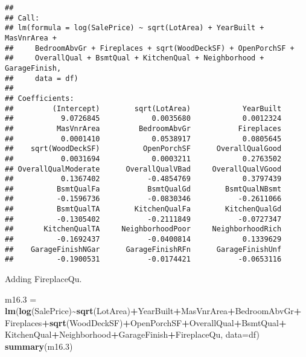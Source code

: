 \documentclass[
]{article}
\newenvironment{Shaded}{\begin{snugshade}}{\end{snugshade}}
\newcommand{\AttributeTok}[1]{\textcolor[rgb]{0.13,0.29,0.53}{#1}}
\newcommand{\FloatTok}[1]{\textcolor[rgb]{0.00,0.00,0.81}{#1}}
\newcommand{\FunctionTok}[1]{\textcolor[rgb]{0.13,0.29,0.53}{\textbf{#1}}}
\newcommand{\NormalTok}[1]{#1}
\newcommand{\OtherTok}[1]{\textcolor[rgb]{0.56,0.35,0.01}{#1}}
\newcommand{\SpecialCharTok}[1]{\textcolor[rgb]{0.81,0.36,0.00}{\textbf{#1}}}
\begin{document}
\begin{verbatim}
## 
## Call:
## lm(formula = log(SalePrice) ~ sqrt(LotArea) + YearBuilt + MasVnrArea + 
##     BedroomAbvGr + Fireplaces + sqrt(WoodDeckSF) + OpenPorchSF + 
##     OverallQual + BsmtQual + KitchenQual + Neighborhood + GarageFinish, 
##     data = df)
## 
## Coefficients:
##         (Intercept)        sqrt(LotArea)            YearBuilt  
##           9.0726845            0.0035680            0.0012324  
##          MasVnrArea         BedroomAbvGr           Fireplaces  
##           0.0001410            0.0538917            0.0805645  
##    sqrt(WoodDeckSF)          OpenPorchSF      OverallQualGood  
##           0.0031694            0.0003211            0.2763502  
## OverallQualModerate      OverallQualVBad     OverallQualVGood  
##           0.1367402           -0.4854769            0.3797439  
##          BsmtQualFa           BsmtQualGd        BsmtQualNBsmt  
##          -0.1596736           -0.0830346           -0.2611066  
##          BsmtQualTA        KitchenQualFa        KitchenQualGd  
##          -0.1305402           -0.2111849           -0.0727347  
##       KitchenQualTA     NeighborhoodPoor     NeighborhoodRich  
##          -0.1692437           -0.0400814            0.1339629  
##    GarageFinishNGar      GarageFinishRFn      GarageFinishUnf  
##          -0.1900531           -0.0174421           -0.0653116
\end{verbatim}

Adding FireplaceQu.

\begin{Shaded}
\begin{Highlighting}[]
\NormalTok{m16}\FloatTok{.3} \OtherTok{=} \FunctionTok{lm}\NormalTok{(}\FunctionTok{log}\NormalTok{(SalePrice)}\SpecialCharTok{\textasciitilde{}}\FunctionTok{sqrt}\NormalTok{(LotArea)}\SpecialCharTok{+}\NormalTok{YearBuilt}\SpecialCharTok{+}\NormalTok{MasVnrArea}\SpecialCharTok{+}\NormalTok{BedroomAbvGr}\SpecialCharTok{+}
\NormalTok{             Fireplaces}\SpecialCharTok{+}\FunctionTok{sqrt}\NormalTok{(WoodDeckSF)}\SpecialCharTok{+}\NormalTok{OpenPorchSF}\SpecialCharTok{+}\NormalTok{OverallQual}\SpecialCharTok{+}\NormalTok{BsmtQual}\SpecialCharTok{+}
\NormalTok{             KitchenQual}\SpecialCharTok{+}\NormalTok{Neighborhood}\SpecialCharTok{+}\NormalTok{GarageFinish}\SpecialCharTok{+}\NormalTok{FireplaceQu, }\AttributeTok{data=}\NormalTok{df)}
\FunctionTok{summary}\NormalTok{(m16}\FloatTok{.3}\NormalTok{)}
\end{Highlighting}
\end{Shaded}
\end{document}

